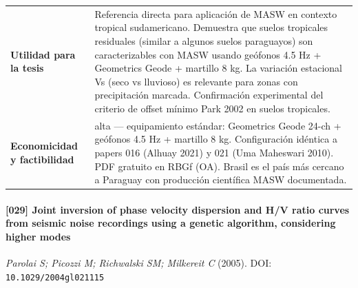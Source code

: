 \begin{center}
\begin{tabularx}{\textwidth}{@{}>{\bfseries}p{3.3cm} X@{}}
Utilidad para la tesis & Referencia directa para aplicación de MASW en contexto tropical sudamericano. Demuestra que suelos tropicales residuales (similar a algunos suelos paraguayos) son caracterizables con MASW usando geófonos 4.5 Hz + Geometrics Geode + martillo 8 kg. La variación estacional Vs (seco vs lluvioso) es relevante para zonas con precipitación marcada. Confirmación experimental del criterio de offset mínimo Park 2002 en suelos tropicales. \\
Economicidad y factibilidad & alta --- equipamiento estándar: Geometrics Geode 24-ch + geófonos 4.5 Hz + martillo 8 kg. Configuración idéntica a papers 016 (Alhuay 2021) y 021 (Uma Maheswari 2010). PDF gratuito en RBGf (OA). Brasil es el país más cercano a Paraguay con producción científica MASW documentada. \\
\bottomrule
\end{tabularx}
\end{center}

\paragraph{[029] Joint inversion of phase velocity dispersion and H/V ratio curves from seismic noise recordings using a genetic algorithm, considering higher modes} \emph{Parolai S; Picozzi M; Richwalski SM; Milkereit C} (2005).
{\scriptsize DOI: \texttt{10.1029/2004gl021115}}

